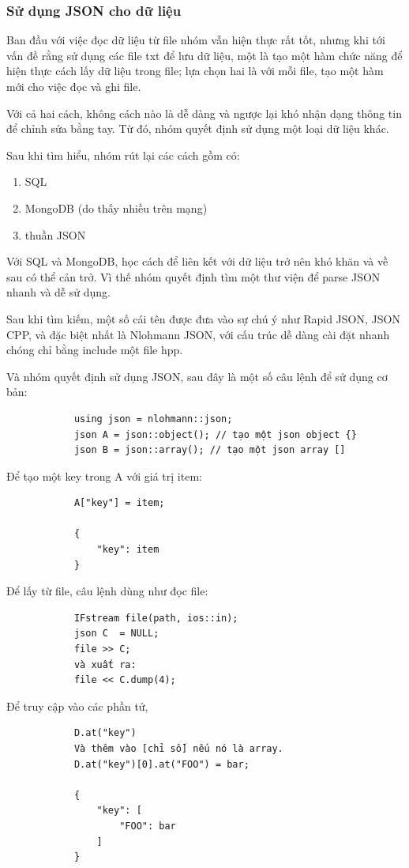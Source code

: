 \documentclass[12pt,a4paper]{report}
\begin{document}
            \subsubsection{Sử dụng JSON cho dữ liệu}
            Ban đầu với việc đọc dữ liệu từ file nhóm vẫn hiện thực rất tốt, nhưng khi tới vấn đề rằng sử dụng các file txt để lưu dữ liệu, một là tạo một hàm chức năng để hiện thực cách lấy dữ liệu trong file; lựa chọn hai là với mỗi file, tạo một hàm mới cho việc đọc và ghi file.\par
            Với cả hai cách, không cách nào là dễ dàng và ngược lại khó nhận dạng thông tin để chỉnh sửa bằng tay. Từ đó, nhóm quyết định sử dụng một loại dữ liệu khác. \par
            Sau khi tìm hiểu, nhóm rút lại các cách gồm có:
            \begin{enumerate}
                \item SQL
                \item MongoDB (do thấy nhiều trên mạng)
                \item thuần JSON
            \end{enumerate}
            Với SQL và MongoDB, học cách để liên kết với dữ liệu trở nên khó khăn và về sau có thể cản trở. Vì thế nhóm quyết định tìm một thư viện để parse JSON nhanh và dễ sử dụng.\par
            Sau khi tìm kiếm, một số cái tên được đưa vào sự chú ý như Rapid JSON, JSON CPP, và đặc biệt nhất là Nlohmann JSON, với cấu trúc dễ dàng cài đặt nhanh chóng chỉ bằng include một file hpp.\par
            Và nhóm quyết định sử dụng JSON, sau đây là một số câu lệnh để sử dụng cơ bản:
            \begin{verbatim}
            using json = nlohmann::json;
            json A = json::object(); // tạo một json object {}
            json B = json::array(); // tạo một json array []
            \end{verbatim}
            Để tạo một key trong A với giá trị item:
            \begin{verbatim}
            A["key"] = item;

            {
                "key": item
            }
            \end{verbatim}
            Để lấy từ file, câu lệnh dùng như đọc file:
            \begin{verbatim}
            IFstream file(path, ios::in);
            json C  = NULL;
            file >> C;
            và xuất ra:
            file << C.dump(4);
            \end{verbatim}
            Để truy cập vào các phần tử,
            \begin{verbatim}
            D.at("key")
            Và thêm vào [chỉ số] nếu nó là array.
            D.at("key")[0].at("FOO") = bar;

            {
                "key": [
                    "FOO": bar
                ]
            }
            \end{verbatim}
\end{document}
